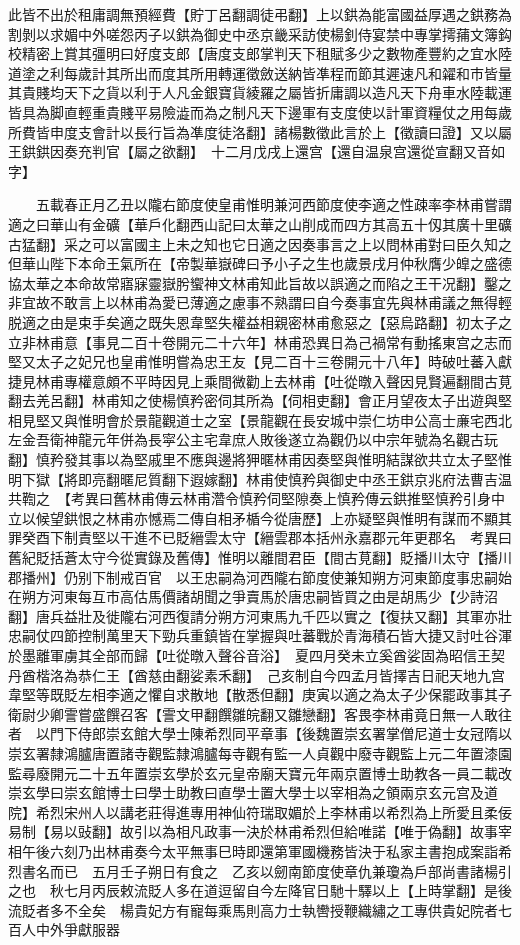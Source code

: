 此皆不出於租庸調無預經費【貯丁呂翻調徒弔翻】上以鉷為能富國益厚遇之鉷務為割剝以求媚中外嗟怨丙子以鉷為御史中丞京畿采訪使楊釗侍宴禁中專掌摴蒱文簿鈎校精密上賞其彊明曰好度支郎【唐度支郎掌判天下租賦多少之數物產豐約之宜水陸道塗之利每歲計其所出而度其所用轉運徵斂送納皆凖程而節其遲速凡和糴和市皆量其貴賤均天下之貨以利于人凡金銀寶貨綾羅之屬皆折庸調以造凡天下舟車水陸載運皆具為脚直輕重貴賤平易險澁而為之制凡天下邊軍有支度使以計軍資糧仗之用每歲所費皆申度支會計以長行旨為凖度徒洛翻】諸楊數徵此言於上【徵讀曰證】又以屬王鉷鉷因奏充判官【屬之欲翻】　十二月戊戌上還宫【還自温泉宫還從宣翻又音如字】

　　五載春正月乙丑以隴右節度使皇甫惟明兼河西節度使李適之性疎率李林甫嘗謂適之曰華山有金礦【華戶化翻西山記曰太華之山削成而四方其高五十仭其廣十里礦古猛翻】采之可以富國主上未之知也它日適之因奏事言之上以問林甫對曰臣久知之但華山陛下本命王氣所在【帝製華嶽碑曰予小子之生也歲景戌月仲秋膺少皥之盛德協太華之本命故常寤寐靈嶽肹蠁神文林甫知此旨故以誤適之而陷之王干况翻】鑿之非宜故不敢言上以林甫為愛已薄適之慮事不熟謂曰自今奏事宜先與林甫議之無得輕脱適之由是束手矣適之既失恩韋堅失權益相親密林甫愈惡之【惡烏路翻】初太子之立非林甫意【事見二百十卷開元二十六年】林甫恐異日為己禍常有動搖東宫之志而堅又太子之妃兄也皇甫惟明嘗為忠王友【見二百十三卷開元十八年】時破吐蕃入獻捷見林甫專權意頗不平時因見上乘間微勸上去林甫【吐從暾入聲因見賢遍翻間古莧翻去羌呂翻】林甫知之使楊慎矜密伺其所為【伺相吏翻】會正月望夜太子出遊與堅相見堅又與惟明會於景龍觀道士之室【景龍觀在長安城中崇仁坊申公高士亷宅西北左金吾衛神龍元年併為長寜公主宅韋庶人敗後遂立為觀仍以中宗年號為名觀古玩翻】慎矜發其事以為堅戚里不應與邊將狎暱林甫因奏堅與惟明結謀欲共立太子堅惟明下獄【將即亮翻暱尼質翻下遐嫁翻】林甫使慎矜與御史中丞王鉷京兆府法曹吉温共鞫之　【考異曰舊林甫傳云林甫濳令慎矜伺堅隙奏上慎矜傳云鉷推堅慎矜引身中立以候望鉷恨之林甫亦憾焉二傳自相矛楯今從唐歷】上亦疑堅與惟明有謀而不顯其罪癸酉下制責堅以干進不已貶縉雲太守【縉雲郡本括州永嘉郡元年更郡名　考異曰舊紀貶括蒼太守今從實錄及舊傳】惟明以離間君臣【間古莧翻】貶播川太守【播川郡播州】仍别下制戒百官　以王忠嗣為河西隴右節度使兼知朔方河東節度事忠嗣始在朔方河東每互市高估馬價諸胡聞之爭賣馬於唐忠嗣皆買之由是胡馬少【少詩沼翻】唐兵益壯及徙隴右河西復請分朔方河東馬九千匹以實之【復扶又翻】其軍亦壯忠嗣仗四節控制萬里天下勁兵重鎮皆在掌握與吐蕃戰於青海積石皆大捷又討吐谷渾於墨離軍虜其全部而歸【吐從暾入聲谷音浴】　夏四月癸未立奚酋娑固為昭信王契丹酋楷洛為恭仁王【酋慈由翻娑素禾翻】　己亥制自今四孟月皆擇吉日祀天地九宫　韋堅等既貶左相李適之懼自求散地【散悉但翻】庚寅以適之為太子少保罷政事其子衛尉少卿霅嘗盛饌召客【霅文甲翻饌雛皖翻又雛戀翻】客畏李林甫竟日無一人敢往者　以門下侍郎崇玄館大學士陳希烈同平章事【後魏置崇玄署掌僧尼道士女冠隋以崇玄署隸鴻臚唐置諸寺觀監隸鴻臚每寺觀有監一人貞觀中廢寺觀監上元二年置漆園監尋廢開元二十五年置崇玄學於玄元皇帝廟天寶元年兩京置博士助教各一員二載改崇玄學曰崇玄館博士曰學士助教曰直學士置大學士以宰相為之領兩京玄元宫及道院】希烈宋州人以講老莊得進專用神仙符瑞取媚於上李林甫以希烈為上所愛且柔佞易制【易以䜴翻】故引以為相凡政事一決於林甫希烈但給唯諾【唯于偽翻】故事宰相午後六刻乃出林甫奏今太平無事巳時即還第軍國機務皆決于私家主書抱成案詣希烈書名而已　五月壬子朔日有食之　乙亥以劒南節度使章仇兼瓊為戶部尚書諸楊引之也　秋七月丙辰敕流貶人多在道逗留自今左降官日馳十驛以上【上時掌翻】是後流貶者多不全矣　楊貴妃方有寵每乘馬則高力士執轡授鞭織繡之工專供貴妃院者七百人中外爭獻服器
